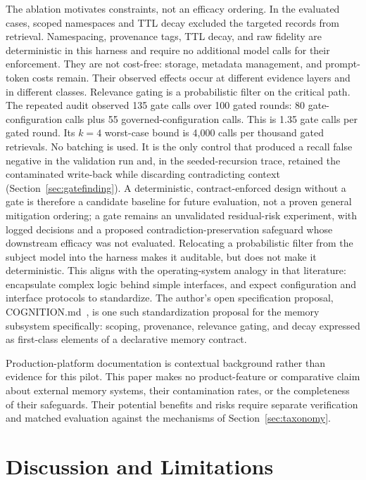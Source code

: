 \documentclass[11pt]{article}
\begin{document}
The ablation motivates constraints, not an efficacy ordering. In the
evaluated cases, scoped namespaces and TTL decay excluded the targeted
records from retrieval. Namespacing, provenance tags, TTL decay, and raw
fidelity are deterministic in this harness
and require no additional model calls for their enforcement. They are not
cost-free: storage, metadata management, and prompt-token costs remain.
Their observed effects occur at
different evidence layers and in different classes. Relevance gating is a
probabilistic filter on the critical path. The repeated audit observed 135
gate calls over 100 gated rounds: 80 gate-configuration calls plus 55
governed-configuration calls. This is 1.35 gate calls per gated round. Its
$k{=}4$ worst-case bound is 4{,}000 calls per thousand gated retrievals. No
batching is used. It is the only control that produced a recall false negative
in the validation run and, in the seeded-recursion trace, retained the
contaminated write-back while discarding contradicting context
(Section~\ref{sec:gatefinding}). A deterministic, contract-enforced design
without a gate is therefore a candidate baseline for future evaluation, not a
proven general mitigation ordering; a gate remains an unvalidated
residual-risk experiment, with logged decisions and a proposed
contradiction-preservation safeguard whose downstream efficacy was not
evaluated. Relocating a probabilistic filter from the subject model into
the harness makes it auditable, but does not make it deterministic. This
aligns with the operating-system analogy in that literature: encapsulate
complex logic behind simple interfaces, and expect configuration and
interface protocols to standardize. The author's open specification
proposal, COGNITION.md~\cite{arana2026cognition}, is one such
standardization proposal for the memory subsystem specifically: scoping,
provenance, relevance gating, and decay expressed as first-class elements of
a declarative memory contract.

Production-platform documentation is contextual background rather than
evidence for this pilot. This paper makes no product-feature or comparative
claim about external memory systems, their contamination rates, or the
completeness of their safeguards. Their potential benefits and risks require
separate verification and matched evaluation against the mechanisms of
Section~\ref{sec:taxonomy}.

\section{Discussion and Limitations}
\end{document}

